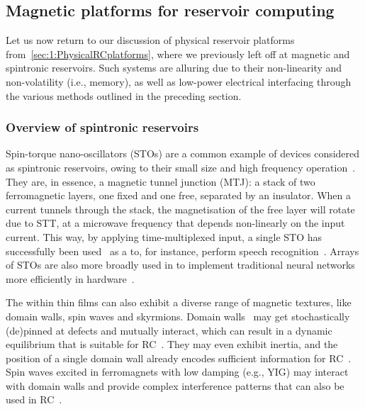 \subsection{Magnetic platforms for reservoir computing}\label{sec:1_RC_magnetic}
Let us now return to our discussion of physical reservoir platforms from~\cref{sec:1:PhysicalRCplatforms}, where we previously left off at magnetic and spintronic reservoirs.
Such systems are alluring due to their non-linearity and non-volatility (i.e., memory), as well as low-power electrical interfacing through the various methods outlined in the preceding section.

\subsubsection{Overview of spintronic reservoirs}
Spin-torque nano-oscillators (STOs) are a common example of devices considered as spintronic reservoirs, owing to their small size and high frequency operation~\cite{tsunegi2019STOforcedsyncRC}.
They are, in essence, a magnetic tunnel junction (MTJ): a stack of two ferromagnetic layers, one fixed and one free, separated by an insulator.
When a current tunnels through the stack, the magnetisation of the free layer will rotate due to STT, at a microwave frequency that depends non-linearly on the input current.
This way, by applying time-multiplexed input, a single STO has successfully been used~\cite{tsunegi2019STOforcedsyncRC} as a  to, for instance, perform speech recognition~\cite{STO_RC_Riou2021,NeuromorphicOscillators}.
Arrays of STOs are also more broadly used in  to implement traditional neural networks more efficiently in hardware~\cite{VowelRecognition4STO}. \par
The  within  thin films can also exhibit a diverse range of magnetic textures, like domain walls, spin waves and skyrmions.
Domain walls~\cite{Venkat_2024} may get stochastically (de)pinned at defects and mutually interact, which can result in a dynamic equilibrium that is suitable for RC~\cite{DynamicEmergence_NanomagneticSystem}.
They may even exhibit inertia, and the position of a single domain wall already encodes sufficient information for RC~\cite{RC_DW}.
Spin waves excited in ferromagnets with low damping (e.g., YIG) may interact with domain walls and provide complex interference patterns that can also be used in RC~\cite{RC_SpinWaveInterference}.
